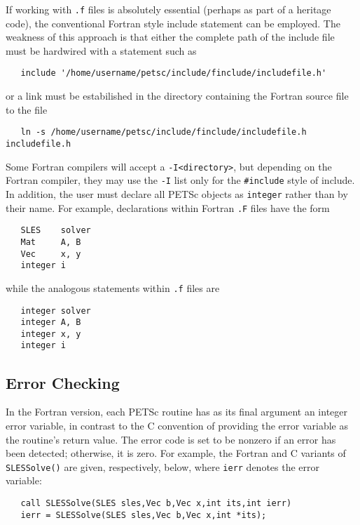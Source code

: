 If working with {\tt .f} files is absolutely essential (perhaps as
part of a heritage code), the conventional Fortran style include
statement can be employed.  The weakness of this approach is that either the
complete path of the include file must be hardwired with a statement such as
\begin{verbatim}
   include '/home/username/petsc/include/finclude/includefile.h'
\end{verbatim}
or a link must be estabilished in the directory containing the Fortran source
file to the file
\begin{verbatim}
   ln -s /home/username/petsc/include/finclude/includefile.h includefile.h
\end{verbatim}
Some Fortran compilers will accept a {\tt -I<directory>}, but depending on the
Fortran compiler, they may use the {\tt -I} list only for the {\tt \#include}
style of include.
In addition, the user must declare all PETSc objects as {\tt integer} 
rather than by their name. For example, declarations within Fortran
{\tt .F} files have the form
\begin{verbatim}
   SLES    solver
   Mat     A, B
   Vec     x, y
   integer i
\end{verbatim}
while the analogous statements within {\tt .f} files are
\begin{verbatim}
   integer solver
   integer A, B
   integer x, y
   integer i
\end{verbatim}

\subsection{Error Checking}
\label{sec:fortran_errors}

In the Fortran version, each PETSc routine has as its final argument
an integer error variable, in contrast to the C convention of
providing the error variable as the routine's return value.  The error
code is set to be nonzero if an error has been detected; otherwise, it
is zero.  For example, the Fortran and C variants of {\tt SLESSolve()} are
given, respectively, below, where {\tt ierr} denotes the error variable:
\begin{verbatim}
   call SLESSolve(SLES sles,Vec b,Vec x,int its,int ierr)
   ierr = SLESSolve(SLES sles,Vec b,Vec x,int *its);
\end{verbatim}

